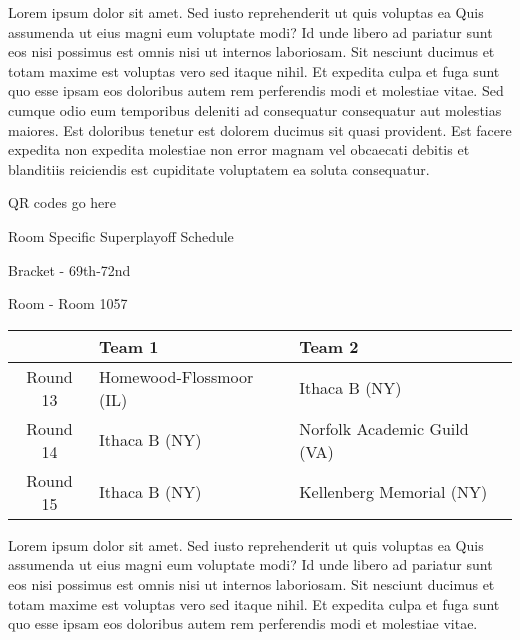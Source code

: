 \documentclass{article}%
\begin{document}
Lorem ipsum dolor sit amet. Sed iusto reprehenderit ut quis voluptas ea Quis assumenda ut eius magni eum voluptate modi? Id unde libero ad pariatur sunt eos nisi possimus est omnis nisi ut internos laboriosam. Sit nesciunt ducimus et totam maxime est voluptas vero sed itaque nihil. Et expedita culpa et fuga sunt quo esse ipsam eos doloribus autem rem perferendis modi et molestiae vitae.\newline%
\newline%
Sed cumque odio eum temporibus deleniti ad consequatur consequatur aut molestias maiores. Est doloribus tenetur est dolorem ducimus sit quasi provident. Est facere expedita non expedita molestiae non error magnam vel obcaecati debitis et blanditiis reiciendis est cupiditate voluptatem ea soluta consequatur.%
\vspace*{140pt}%
\begin{center}%
\begin{Huge}%
QR codes go here%
\end{Huge}%
\end{center}%
\newpage%
\begin{center}%
\begin{Huge}%
Room Specific Superplayoff Schedule%
\end{Huge}%
\vspace*{8pt}%
\linebreak%
\begin{Large}%
Bracket {-} 69th{-}72nd%
\end{Large}%
\vspace*{8pt}%
\linebreak%
\vspace*{8pt}%
\begin{Large}%
Room {-} Room 1057%
\end{Large}%
\end{center}%
%
\begin{tabularx}{\textwidth}{|c|Y|Y|}%
\hline%
&Team 1&Team 2\\%
\hline%
Round 13&Homewood{-}Flossmoor (IL)&Ithaca B (NY)\\%
Round 14&Ithaca B (NY)&Norfolk Academic Guild (VA)\\%
Round 15&Ithaca B (NY)&Kellenberg Memorial (NY)\\%
\hline%
\end{tabularx}%
\vspace*{8pt}%
\newline%
Lorem ipsum dolor sit amet. Sed iusto reprehenderit ut quis voluptas ea Quis assumenda ut eius magni eum voluptate modi? Id unde libero ad pariatur sunt eos nisi possimus est omnis nisi ut internos laboriosam. Sit nesciunt ducimus et totam maxime est voluptas vero sed itaque nihil. Et expedita culpa et fuga sunt quo esse ipsam eos doloribus autem rem perferendis modi et molestiae vitae.\newline%
\end{document}
